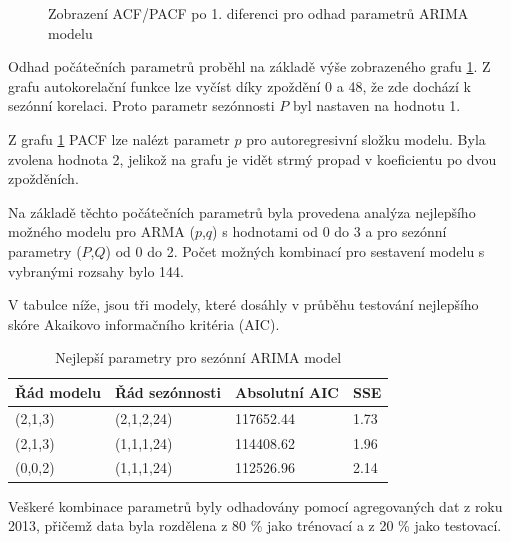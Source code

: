 \documentclass[FM,BP,fonts]{tulthesis}
\begin{document}
\begin{figure}[htbp]
 	\centering
 	\caption{Zobrazení ACF/PACF po 1. diferenci pro odhad parametrů ARIMA modelu}
 	\label{fig:arima_acf_pacf}
 \end{figure}
Odhad počátečních parametrů proběhl na základě výše zobrazeného grafu \ref{fig:arima_acf_pacf}. Z grafu autokorelační funkce lze vyčíst díky zpoždění 0 a 48, že zde dochází k sezónní korelaci. Proto parametr sezónnosti $P$ byl nastaven na hodnotu 1.

Z grafu \ref{fig:arima_acf_pacf} PACF lze nalézt parametr $p$ pro autoregresivní složku modelu. Byla zvolena hodnota 2, jelikož na grafu je vidět strmý propad v koeficientu po dvou zpožděních. 

Na základě těchto počátečních parametrů byla provedena analýza nejlepšího možného modelu pro ARMA ($p$,$q$) s hodnotami od 0 do 3 a pro sezónní parametry ($P$,$Q$) od 0 do 2. Počet možných kombinací pro sestavení modelu s vybranými rozsahy bylo 144.

V tabulce níže, jsou tři modely, které dosáhly v průběhu testování nejlepšího skóre Akaikovo informačního kritéria (AIC).

\begin{table}[!ht]
	\centering
	\caption{Nejlepší parametry pro sezónní ARIMA model}
	\label{Tab:arimamodels}
	\begin{tabularx}{\linewidth}{lXXX}
		\hline
		\textbf{Řád modelu} & \textbf{Řád sezónnosti} & \textbf{Absolutní AIC} & \textbf{SSE} \\ \hline
		(2,1,3) & (2,1,2,24) & 117652.44 & 1.73 \\
		(2,1,3) & (1,1,1,24) & 114408.62 & 1.96 \\
		(0,0,2) & (1,1,1,24) & 112526.96 & 2.14 \\
	\end{tabularx}
\end{table}
Veškeré kombinace parametrů byly odhadovány pomocí agregovaných dat z roku 2013, přičemž data byla rozdělena z 80 \% jako trénovací a z 20 \% jako testovací. 
\end{document}
